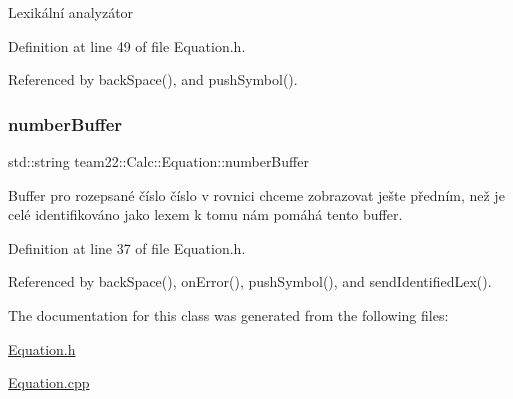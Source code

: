 Lexikální analyzátor 

Definition at line 49 of file Equation.\+h.



Referenced by back\+Space(), and push\+Symbol().

\mbox{\label{classteam22_1_1_calc_1_1_equation_a816d00b732bc472768b41da216a4335c}} 
\subsubsection{\texorpdfstring{number\+Buffer}{numberBuffer}}
{\footnotesize\ttfamily std\+::string team22\+::\+Calc\+::\+Equation\+::number\+Buffer\hspace{0.3cm}{\ttfamily [private]}}

Buffer pro rozepsané číslo číslo v rovnici chceme zobrazovat ješte předním, než je celé identifikováno jako lexem k tomu nám pomáhá tento buffer. 

Definition at line 37 of file Equation.\+h.



Referenced by back\+Space(), on\+Error(), push\+Symbol(), and send\+Identified\+Lex().



The documentation for this class was generated from the following files\+:\begin{DoxyCompactItemize}
\item 
\hyperlink{_equation_8h}{Equation.\+h}\item 
\hyperlink{_equation_8cpp}{Equation.\+cpp}\end{DoxyCompactItemize}
